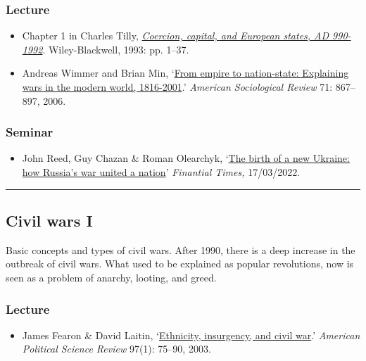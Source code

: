 \documentclass[12pt, a4paper]{article}
\begin{document}
\subsubsection*{Lecture}

\begin{itemize}
\setlength\itemsep{0pt}
\item Chapter 1 in Charles Tilly, \href{https://www.wiley.com/en-us/Coercion%2C+Capital+and+European+States%2C+A+D+990+1992-p-9781557863683}{\textit{Coercion, capital, and European states, AD 990-1992}}. Wiley-Blackwell, 1993: pp. 1--37.
\item Andreas Wimmer and Brian Min, `\href{https://doi.org/10.1177/000312240607100601}{From empire to nation-state: Explaining wars in the modern world, 1816-2001}.' \textit{American Sociological Review} 71: 867--897, 2006.
\end{itemize}

\subsubsection*{Seminar}

\begin{itemize}
\setlength\itemsep{0pt}
\item John Reed, Guy Chazan \& Roman Olearchyk, `\href{https://www.ft.com/content/9ab50dee-67f5-4e1b-8456-d8f11814ef18}{The birth of a new Ukraine: how Russia's war united a nation}' \textit{Finantial Times,} 17/03/2022.
\end{itemize}

\hrule %

\subsection{Civil wars I}

Basic concepts and types of civil wars. After 1990, there is a deep increase in the outbreak of civil wars. What used to be explained as popular revolutions, now is seen as a problem of anarchy, looting, and greed.

\subsubsection*{Lecture}

\begin{itemize}
\setlength\itemsep{0pt}
\item James Fearon \& David Laitin, `\href{https://doi.org/10.1017/S0003055403000534}{Ethnicity, insurgency, and civil war}.' \textit{American Political Science Review} 97(1): 75--90, 2003.
\end{itemize}
\end{document}
